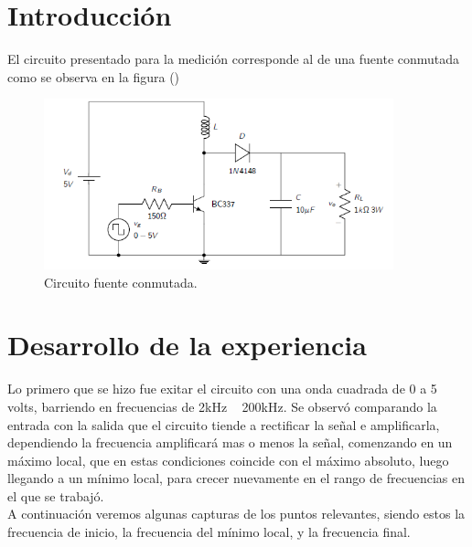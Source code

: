









\section{Introducción}
El circuito presentado para la medición corresponde al de una fuente conmutada como se observa en la figura ()
\begin{figure}[H]
	\centering
	\includegraphics[width=0.9\textwidth]{Imagenes/circ.png}
\caption{Circuito fuente conmutada.}
	\label{fig:fcon}
\end{figure}

\section{Desarrollo de la experiencia}
Lo primero que se hizo fue exitar el circuito con una onda cuadrada de 0 a 5 volts, barriendo en frecuencias de 2kHz ~ 200kHz.
Se observó comparando la entrada con la salida que el circuito tiende a rectificar la señal e amplificarla, dependiendo la frecuencia amplificará mas o menos la señal, comenzando en un máximo local, que en estas condiciones coincide con el máximo absoluto, luego llegando a un mínimo local, para crecer nuevamente en el rango de frecuencias en el que se trabajó.\\
A continuación veremos algunas capturas de los puntos relevantes, siendo estos la frecuencia de inicio, la frecuencia del mínimo local, y la frecuencia final.

